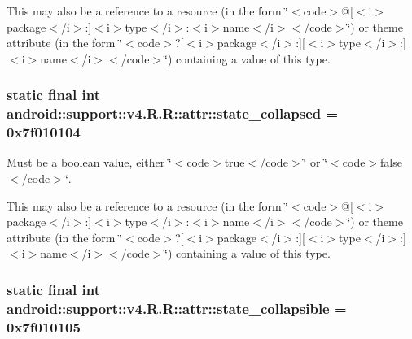 This may also be a reference to a resource (in the form \char`\"{}$<$code$>$@\mbox{[}$<$i$>$package$<$/i$>$:\mbox{]}$<$i$>$type$<$/i$>$:$<$i$>$name$<$/i$>$$<$/code$>$\char`\"{}) or theme attribute (in the form \char`\"{}$<$code$>$?\mbox{[}$<$i$>$package$<$/i$>$:\mbox{]}\mbox{[}$<$i$>$type$<$/i$>$:\mbox{]}$<$i$>$name$<$/i$>$$<$/code$>$\char`\"{}) containing a value of this type. \hypertarget{classandroid_1_1support_1_1v4_1_1_r_1_1attr_488ebee3ccb8eb35508fe0cc605c9d56}{
\subsubsection[{state\_\-collapsed}]{\setlength{\rightskip}{0pt plus 5cm}static final int android::support::v4.R.R::attr::state\_\-collapsed = 0x7f010104}}
\label{classandroid_1_1support_1_1v4_1_1_r_1_1attr_488ebee3ccb8eb35508fe0cc605c9d56}


Must be a boolean value, either \char`\"{}$<$code$>$true$<$/code$>$\char`\"{} or \char`\"{}$<$code$>$false$<$/code$>$\char`\"{}. 

This may also be a reference to a resource (in the form \char`\"{}$<$code$>$@\mbox{[}$<$i$>$package$<$/i$>$:\mbox{]}$<$i$>$type$<$/i$>$:$<$i$>$name$<$/i$>$$<$/code$>$\char`\"{}) or theme attribute (in the form \char`\"{}$<$code$>$?\mbox{[}$<$i$>$package$<$/i$>$:\mbox{]}\mbox{[}$<$i$>$type$<$/i$>$:\mbox{]}$<$i$>$name$<$/i$>$$<$/code$>$\char`\"{}) containing a value of this type. \hypertarget{classandroid_1_1support_1_1v4_1_1_r_1_1attr_b18ddec4dafc95ead6c43b00dfbb0ad0}{
\subsubsection[{state\_\-collapsible}]{\setlength{\rightskip}{0pt plus 5cm}static final int android::support::v4.R.R::attr::state\_\-collapsible = 0x7f010105}}
\label{classandroid_1_1support_1_1v4_1_1_r_1_1attr_b18ddec4dafc95ead6c43b00dfbb0ad0}


